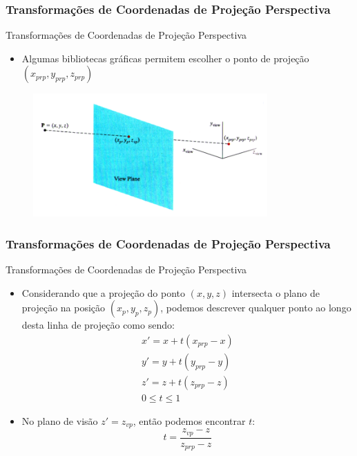 \documentclass{beamer}
\begin{document}
\begin{frame}
\frametitle{Transformações de Coordenadas de Projeção Perspectiva}
	\begin{block}{Transformações de Coordenadas de Projeção Perspectiva}
		\begin{itemize}
			\item Algumas bibliotecas gráficas permitem escolher o ponto de projeção $(x_{prp},y_{prp},z_{prp})$
		\end{itemize}
	\end{block}
	
	\begin{figure}[!h]
			\begin{center}
			\includegraphics[width=0.8\textwidth]{Figures/PonPro2}
			\end{center}
	\end{figure}
\end{frame}


\begin{frame}
\frametitle{Transformações de Coordenadas de Projeção Perspectiva}
	\begin{block}{Transformações de Coordenadas de Projeção Perspectiva}
		\begin{itemize}
			\item Considerando que a projeção do ponto $(x,y,z)$ intersecta o plano de projeção na posição $(x_p,y_p,z_p)$, podemos descrever qualquer ponto ao longo desta linha de projeção como sendo:
			\begin{eqnarray*}
				x' = x +t(x_{prp}-x) \\
				y' = y +t(y_{prp}-y) \\
				z' = z +t(z_{prp}-z) \\
				0 \leq t \leq 1
			\end{eqnarray*}
		
		\item No plano de visão $z' = z_{vp}$, então podemos encontrar $t$:
		\begin{equation*}
			t = \frac{z_{vp} - z}{z_{prp}-z}
		\end{equation*}
		\end{itemize}	
	\end{block}
\end{frame}

\end{document}
